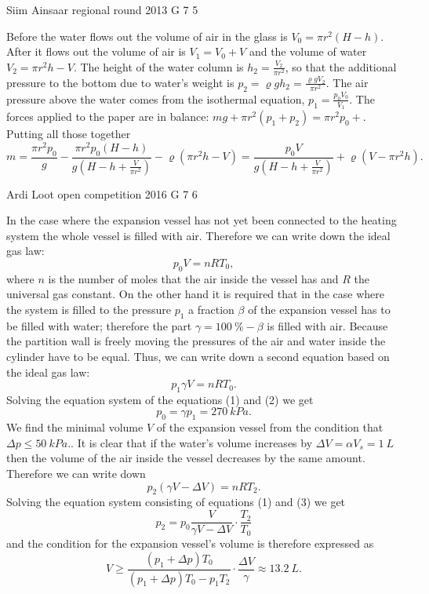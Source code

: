 \documentclass[11pt]{article}
\begin{document}
{Siim Ainsaar} %
{regional round} %
{2013} %
{G 7} %
{5} %
{

\ifEngSolution
Before the water flows out the volume of air in the glass is $V_0 = \pi r^2 (H-h)$. After it flows out the volume of air is $V_1 = V_0 + V$ and the volume of water $V_2 = \pi r^2 h - V$. The height of the water column is $h_2 = \frac{ V_2 }{ \pi r^2 }$, so that the additional pressure to the bottom due to water’s weight is $p_2 = \varrho g h_2 = \frac{ \varrho g V_2 }{ \pi r^2 }$. The air pressure above the water comes from the isothermal equation, $p_1 = \frac{p_0 V_0}{V_1}$. The forces applied to the paper are in balance: $mg + \pi r^2 (p_1 + p_2) = \pi r^2 p_0+$. Putting all those together
\[ m =
\frac{ \pi r^2 p_0 }{ g } -
\frac{ \pi r^2 p_0 (H-h) }{ g \left( H - h + \frac{V}{\pi r^2} \right) } -
\varrho \left( \pi r^2 h - V \right)
=
\frac{ p_0 V }{ g \left( H - h + \frac{V}{ \pi r^2 } \right) } + \varrho \left( V - \pi r^2 h \right).
\]
\fi
}

{Ardi Loot} %
{open competition} %
{2016} %
{G 7} %
{6} %
{

\ifEngSolution
In the case where the expansion vessel has not yet been connected to the heating system the whole vessel is filled with air. Therefore we can write down the ideal gas law:
\begin{equation}
p_{0}V=nRT_{0},\label{eq:2016-lahg-07-paisupaak-eq1}
\end{equation} 
where $n$ is the number of moles that the air inside the vessel has and $R$ the universal gas constant. On the other hand it is required that in the case where the system is filled to the pressure $p_{1}$ a fraction $\beta$ of the expansion vessel has to be filled with water; therefore the part $\gamma=\SI{100}{\%}-\beta$ is filled with air. Because the partition wall is freely moving the pressures of the air and water inside the cylinder have to be equal. Thus, we can write down a second equation based on the ideal gas law:
\begin{equation}
p_{1}\gamma V=nRT_{0}.\label{eq:2016-lahg-07-paisupaak-eq2}
\end{equation} 
Solving the equation system of the equations (1) and (2) we get
\[
p_{0}=\gamma p_{1}=\SI{270}{kPa}.
\] 
We find the minimal volume $V$ of the expansion vessel from the condition that $\Delta p\leq\SI{50}{kPa}.$. It is clear that if the water’s volume increases by $\Delta V=\alpha V_{s}=\SI{1}{L}$ then the volume of the air inside the vessel decreases by the same amount. Therefore we can write down
\begin{equation}
p_{2}\left(\gamma V-\Delta V\right)=nRT_{2}.\label{eq:2016-lahg-07-paisupaak-eq3}
\end{equation} 
Solving the equation system consisting of equations (1) and (3) we get
\[
p_{2}=p_{0}\frac{V}{\gamma V-\Delta V}\cdot\frac{T_{2}}{T_{0}}
\] 
and the condition for the expansion vessel’s volume is therefore expressed as 
\[
V\geq\frac{\left(p_{1}+\Delta p\right)T_{0}}{\left(p_{1}+\Delta p\right)T_{0}-p_{1}T_{2}}\cdot\frac{\Delta V}{\gamma}\approx\SI{13.2}{L}.
\]
\fi
}
\end{document}
